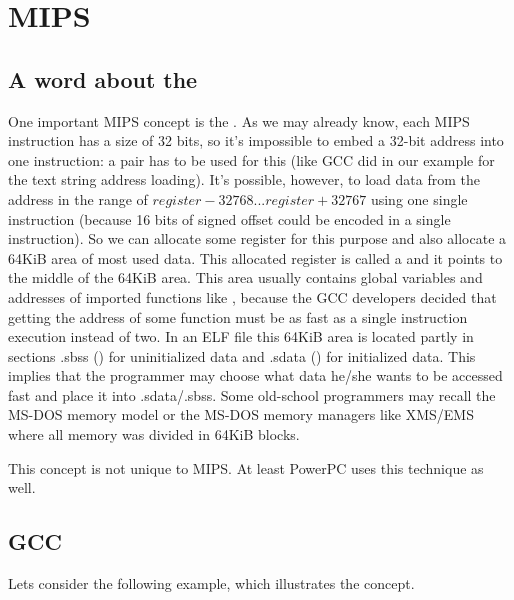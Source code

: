 \section{MIPS}

\subsection{A word about the }
\label{MIPS_GP}


One important MIPS concept is the .
As we may already know, each MIPS instruction has a size of 32 bits, so it's impossible to embed a 32-bit
address into one instruction: a pair has to be used for this 
(like GCC did in our example for the text string address loading).
It's possible, however, to load data from the address in the range of $register-32768...register+32767$ using one
single instruction (because 16 bits of signed offset could be encoded in a single instruction).
So we can allocate some register for this purpose and also allocate a 64KiB area of most used data.
This allocated register is called a  and it points to the middle of the 64KiB area.
This area usually contains global variables and addresses of imported functions like \printf, 
because the GCC developers decided that getting the address of some function must be as fast as a single instruction
execution instead of two.
In an ELF file this 64KiB area is located partly in sections .sbss () for uninitialized data and 
.sdata () for initialized data.
This implies that the programmer may choose what data he/she wants to be accessed fast and place it into 
.sdata/.sbss.
Some old-school programmers may recall the MS-DOS memory model  
or the MS-DOS memory managers like XMS/EMS where all memory was divided in 64KiB blocks.


This concept is not unique to MIPS. At least PowerPC uses this technique as well.

\subsection{\Optimizing GCC}

Lets consider the following example, which illustrates the  concept.



